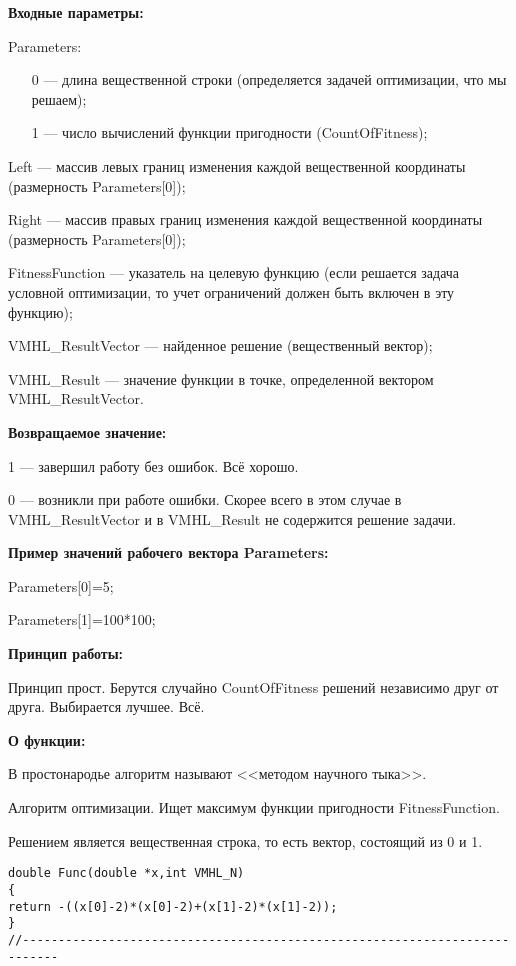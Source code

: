 \documentclass[a4paper,12pt]{article}
\begin{document}
\textbf{Входные параметры:}

 Parameters:
 
 \begin{itemize}
 \item [0] --- длина вещественной строки (определяется задачей оптимизации, что мы решаем);
 \item [1] --- число вычислений функции пригодности (CountOfFitness);
 \end{itemize}
 
 Left --- массив левых границ изменения каждой вещественной координаты (размерность Parameters[0]);
 
 Right --- массив правых границ изменения каждой вещественной координаты (размерность Parameters[0]);
  
 FitnessFunction --- указатель на целевую функцию (если решается задача условной оптимизации, то учет ограничений должен быть включен в эту функцию);
 
 VMHL\_ResultVector --- найденное решение (вещественный вектор);
 
 VMHL\_Result --- значение функции в точке, определенной вектором VMHL\_ResultVector.

\textbf{Возвращаемое значение:}
 
 1 --- завершил работу без ошибок. Всё хорошо.
 
 0 --- возникли при работе ошибки. Скорее всего в этом случае в VMHL\_ResultVector и в VMHL\_Result не содержится решение задачи.
 
\textbf{Пример значений рабочего вектора Parameters:}

 Parameters[0]=5;
 
 Parameters[1]=100*100;
 
 \textbf{Принцип работы:}
 
 Принцип прост. Берутся случайно CountOfFitness решений независимо друг от друга. Выбирается лучшее. Всё.
 
 \textbf{ О функции:}
 
 В простонародье алгоритм называют <<методом научного тыка>>.
 
Алгоритм оптимизации. Ищет максимум функции пригодности FitnessFunction.

Решением является вещественная строка, то есть вектор, состоящий из 0 и 1.

\begin{lstlisting}[caption=Оптимизируемая функция]
double Func(double *x,int VMHL_N)
{
return -((x[0]-2)*(x[0]-2)+(x[1]-2)*(x[1]-2));
}
//---------------------------------------------------------------------------
\end{lstlisting}
\end{document}
